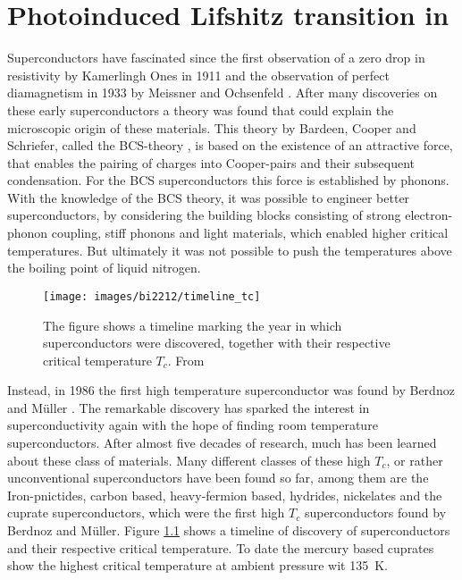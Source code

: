 \chapter{Photoinduced Lifshitz transition in }
\label{ch:bi2212}

Superconductors have fascinated since the first observation of a zero drop in resistivity by Kamerlingh Ones in 1911 \cite{van_delft_discovery_2010} and the observation of perfect diamagnetism in 1933 by Meissner and Ochsenfeld \cite{meissner_neuer_1933}.
After many discoveries on these early superconductors a theory was found that could explain the microscopic origin of these materials.
This theory by Bardeen, Cooper and Schriefer, called the BCS-theory \cite{bardeen_theory_1957}, is based on the existence of an attractive force, that enables the pairing of charges into Cooper-pairs and their subsequent condensation.
For the BCS superconductors this force is established by phonons.
With the knowledge of the BCS theory, it was possible to engineer better superconductors, by considering the building blocks consisting of strong electron-phonon coupling, stiff phonons and light materials, which enabled higher critical temperatures.
But ultimately it was not possible to push the temperatures above the boiling point of liquid nitrogen.

\begin{figure}
	\centering
	\texttt{[image: images/bi2212/timeline\_tc]}
	\caption{The figure shows a timeline marking the year in which superconductors were discovered, together with their respective critical temperature $T_c$. From \cite{pjray_english_2015}}
	\label{fig:timeline}
\end{figure}

Instead, in 1986 the first high temperature superconductor was found by Berdnoz and Müller \cite{bednorz_possible_1986}.
The remarkable discovery has sparked the interest in superconductivity again with the hope of finding room temperature superconductors.
After almost five decades of research, much has been learned about these class of materials.
Many different classes of these high $T_c$, or rather unconventional superconductors have been found so far, among them are the Iron-pnictides, carbon based, heavy-fermion based, hydrides, nickelates and the cuprate superconductors, which were the first high $T_c$ superconductors found by Berdnoz and Müller.
Figure \ref{fig:timeline} shows a timeline of discovery of superconductors and their respective critical temperature.
To date the mercury based cuprates show the highest critical temperature at ambient pressure wit \qty{135}{\kelvin}.

